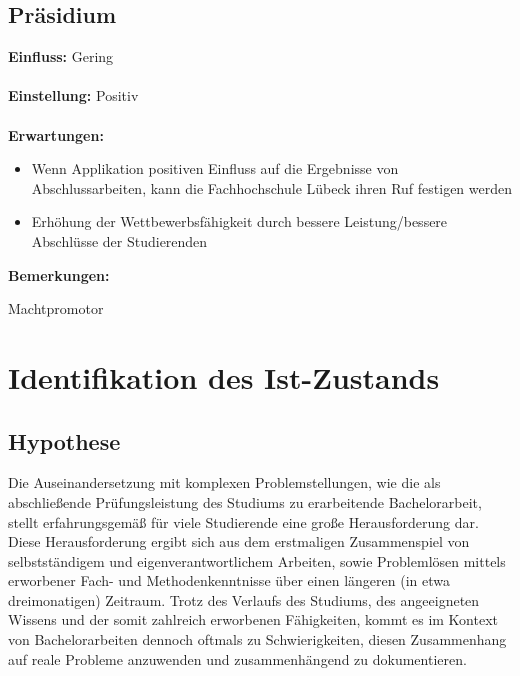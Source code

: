 \documentclass{scrreprt}
\begin{document}
\subsection{Präsidium}
\textbf{Einfluss:} Gering\\\\
\textbf{Einstellung:} Positiv\\\\
\textbf{Erwartungen:}
\begin{itemize}
\item Wenn Applikation positiven Einfluss auf die Ergebnisse von Abschlussarbeiten, kann die Fachhochschule Lübeck ihren Ruf festigen werden
\item Erhöhung der Wettbewerbsfähigkeit durch bessere Leistung/bessere Abschlüsse der Studierenden
\end{itemize}
\textbf{Bemerkungen:}\par Machtpromotor
\newpage

\section{Identifikation des Ist-Zustands}

\subsection{Hypothese}
\par Die Auseinandersetzung mit komplexen Problemstellungen, wie die als abschließende Prüfungsleistung des Studiums zu erarbeitende Bachelorarbeit, stellt erfahrungsgemäß für viele Studierende eine große Herausforderung dar. Diese Herausforderung ergibt sich aus dem erstmaligen Zusammenspiel von selbstständigem und eigenverantwortlichem Arbeiten, sowie Problemlösen mittels erworbener Fach- und Methodenkenntnisse über einen längeren (in etwa dreimonatigen) Zeitraum.
Trotz des Verlaufs des Studiums, des angeeigneten Wissens und der somit zahlreich erworbenen Fähigkeiten, kommt es im Kontext von Bachelorarbeiten dennoch oftmals zu Schwierigkeiten, diesen Zusammenhang auf reale Probleme anzuwenden und zusammenhängend zu dokumentieren.
\end{document}
